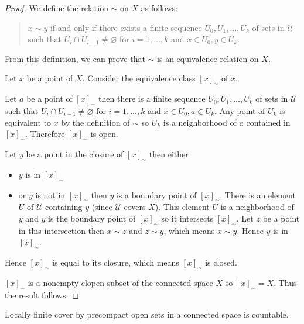 \begin{proof}
	We define the relation $\sim$ on $X$ as follows:
	\begin{quotation}
		$x\sim y$ if and only if there exists a finite sequence $U_{0}, U_{1}, \ldots, U_{k}$ of sets in $\mathcal{U}$ such that $U_{i} \cap U_{i-1} \ne \varnothing$ for $i = 1, \ldots, k$ and $x\in U_{0}, y\in U_{k}$.
	\end{quotation}

	From this definition, we can prove that $\sim$ is an equivalence relation on $X$.

	Let $x$ be a point of $X$. Consider the equivalence class ${[x]}_{\sim}$ of $x$.

	Let $a$ be a point of ${[x]}_{\sim}$ then there is a finite sequence $U_{0}, U_{1}, \ldots, U_{k}$ of sets in $\mathcal{U}$ such that $U_{i} \cap U_{i-1} \ne \varnothing$ for $i = 1, \ldots, k$ and $x\in U_{0}, a\in U_{k}$. Any point of $U_{k}$ is equivalent to $x$ by the definition of $\sim$ so $U_{k}$ is a neighborhood of $a$ contained in ${[x]}_{\sim}$. Therefore ${[x]}_{\sim}$ is open.

	Let $y$ be a point in the closure of ${[x]}_{\sim}$ then either
	\begin{itemize}
		\item $y$ is in ${[x]}_{\sim}$
		\item or $y$ is not in ${[x]}_{\sim}$ then $y$ is a boundary point of ${[x]}_{\sim}$. There is an element $U$ of $\mathcal{U}$ containing $y$ (since $\mathcal{U}$ covers $X$). This element $U$ is a neighborhood of $y$ and $y$ is the boundary point of ${[x]}_{\sim}$ so it intersects ${[x]}_{\sim}$. Let $z$ be a point in this intersection then $x\sim z$ and $z\sim y$, which means $x\sim y$. Hence $y$ is in ${[x]}_{\sim}$.
	\end{itemize}

	Hence ${[x]}_{\sim}$ is equal to its closure, which means ${[x]}_{\sim}$ is closed.

	${[x]}_{\sim}$ is a nonempty clopen subset of the connected space $X$ so ${[x]}_{\sim} = X$. Thus the result follows.
\end{proof}

\begin{note}\label{note:locally-finite-cover-by-precompact-open-sets-in-connected-spaces}
	Locally finite cover by precompact open sets in a connected space is countable.
\end{note}

